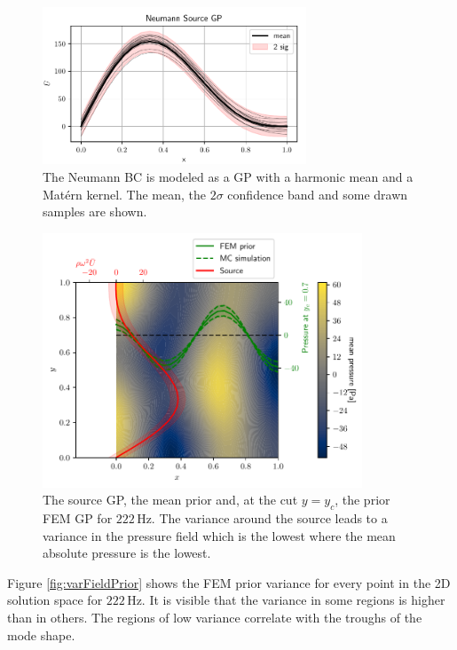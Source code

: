 \documentclass[%
  a4paper,oneside,%
  11pt,%
  smallchapters,
  style=printdev,
  extramargin,
  green,%
  rgb, <cmyk>
  ]{tubsbook}
\begin{document}
\begin{figure}[!ht]
\includegraphics[width=0.7\textwidth]{pics/NeumannBC.pdf}
\centering
\caption[Neumann source GP]{The Neumann BC is modeled as a GP with a harmonic mean and a Mat\'ern kernel. The mean, the $2 \sigma$ confidence band and some drawn samples are shown.}
\label{fig:NeumannBC}
\end{figure}
%
\begin{figure}[!ht]
\includegraphics[width=0.85\textwidth]{pics/SolutionCustom2D.pdf}
\centering
\caption[Overview of the source and prior GP]{The source GP, the mean prior and, at the cut $y=y_c$, the prior FEM GP for $222\, \mathrm{Hz}$. The variance around the source leads to a variance in the pressure field which is the lowest where the mean absolute pressure is the lowest.}
\label{fig:FEMGP}
\end{figure}
%
Figure \ref{fig:varFieldPrior} shows the FEM prior variance for every point in the 2D solution space for $222\, \mathrm{Hz}$. It is visible that the variance in some regions is higher than in others. The regions of low variance correlate with the troughs of the mode shape.
%
\end{document}
